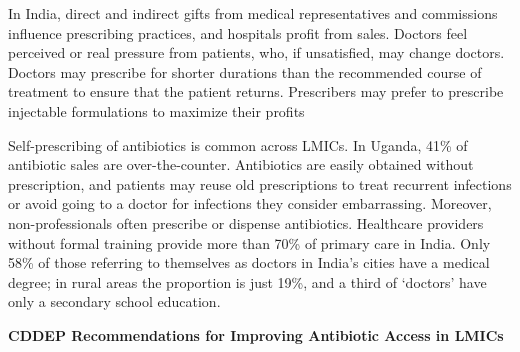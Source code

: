 \documentclass[
  11pt,
  paper=a4,
  ,captions=tableheading
]{scrartcl}
\begin{document}
In India, direct and indirect gifts from medical representatives and
commissions influence prescribing practices, and hospitals profit from
sales. Doctors feel perceived or real pressure from patients, who, if
unsatisfied, may change doctors. Doctors may prescribe for shorter
durations than the recommended course of treatment to ensure that the
patient returns. Prescribers may prefer to prescribe injectable
formulations to maximize their profits

Self-prescribing of antibiotics is common across LMICs. In Uganda, 41\%
of antibiotic sales are over-the-counter. Antibiotics are easily
obtained without prescription, and patients may reuse old prescriptions
to treat recurrent infections or avoid going to a doctor for infections
they consider embarrassing. Moreover, non-professionals often prescribe
or dispense antibiotics. Healthcare providers without formal training
provide more than 70\% of primary care in India. Only 58\% of those
referring to themselves as doctors in India's cities have a medical
degree; in rural areas the proportion is just 19\%, and a third of
`doctors' have only a secondary school education.

\textbf{CDDEP Recommendations for Improving Antibiotic Access in LMICs}
\end{document}
